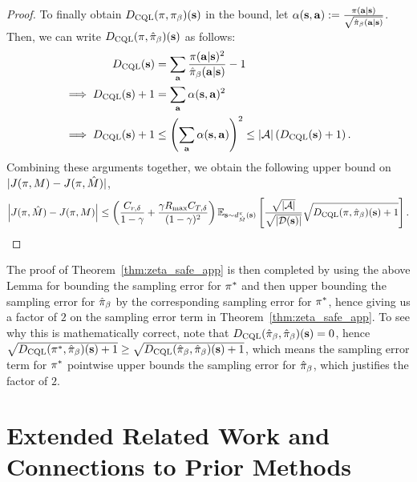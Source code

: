 \begin{proof}
To finally obtain $D_{\text{CQL}}(\pi, {\pi_\beta})(\mathbf{s})$ in the bound, let $\alpha(\mathbf{s}, \mathbf{a}) := \frac{\pi(\mathbf{a}|\mathbf{s})}{\sqrt{\hat{\pi}_\beta(\mathbf{a}|\mathbf{s})}}$. Then, we can write $D_{\text{CQL}}(\pi, \hat{\pi}_\beta)(\mathbf{s})$ as follows:
\begin{align*}
    D_\text{CQL}(\mathbf{s}) &= \sum_{\mathbf{a}} \frac{\pi(\mathbf{a}|\mathbf{s})^2}{\hat{\pi}_\beta(\mathbf{a}|\mathbf{s})} - 1\\
    \implies D_{\text{CQL}}(\mathbf{s}) + 1 &= \sum_{\mathbf{a}} \alpha(\mathbf{s}, \mathbf{a})^{2}\\
    \implies D_{\text{CQL}}(\mathbf{s}) + 1 &\leq \left(\sum_{\mathbf{a}} \alpha(\mathbf{s},\mathbf{a})\right)^2 \leq |\mathcal{A}| \left(D_\text{CQL}(\mathbf{s}) + 1 \right).
\end{align*}
Combining these arguments together, we obtain the following upper bound on $|J(\pi, M) - J(\pi, \hat{M})|$,
\begin{equation*}
    \left\vert J(\pi, \hat{M}) - J(\pi, M) \right\vert \leq \left({\frac{C_{r, \delta}}{1 - \gamma} + \frac{\gamma R_{\max} C_{T, \delta}}{(1 - \gamma)^2}} \right)\mathbb{E}_{\mathbf{s} \sim d^{\pi}_{\hat{M}}(\mathbf{s})}\left[ \frac{\sqrt{|\mathcal{A}|}}{\sqrt{|\mathcal{D}(\mathbf{s})|}} \sqrt{ D_{\text{CQL}}(\pi, \hat{\pi}_\beta)(\mathbf{s}) + 1} \right].
\end{equation*}
\end{proof}
The proof of Theorem~\ref{thm:zeta_safe_app} is then completed by using the above Lemma for bounding the sampling error for $\pi^*$ and then upper bounding the sampling error for $\hat{\pi}_\beta$ by the corresponding sampling error for $\pi^*$, hence giving us a factor of $2$ on the sampling error term in Theorem~\ref{thm:zeta_safe_app}. To see why this is mathematically correct, note that $D_{\text{CQL}}(\hat{\pi}_\beta, \hat{\pi}_\beta)(\mathbf{s}) = 0$, hence $\sqrt{D_{\text{CQL}}(\pi^*, \hat{\pi}_\beta)(\mathbf{s}) + 1} \geq \sqrt{D_{\text{CQL}}(\hat{\pi}_\beta, \hat{\pi}_\beta)(\mathbf{s}) + 1}$, which means the sampling error term for $\pi^*$ pointwise upper bounds the sampling error for $\hat{\pi}_\beta$, which justifies the factor of $2$.


















\section{Extended Related Work and Connections to Prior Methods}
\label{sec:extended_related_work}

